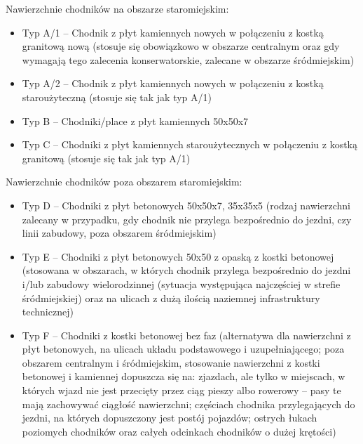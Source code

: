 \documentclass[twoside,12pt]{article}
\begin{document}
Nawierzchnie chodników na obszarze staromiejskim:
	 \begin{itemize}\setlength{\itemsep}{0em}
	 \item Typ A/1 -- Chodnik z płyt kamiennych nowych w połączeniu z kostką granitową nową (stosuje się obowiązkowo w obszarze centralnym oraz gdy wymagają tego zalecenia konserwatorskie, zalecane w obszarze śródmiejskim) \cite{standardy_wroclaw}
	 \item Typ A/2 -- Chodnik z płyt kamiennych nowych w połączeniu z kostką staroużyteczną (stosuje się tak jak typ A/1) \cite{standardy_wroclaw}
	 \item Typ B -- Chodniki/place z płyt kamiennych 50x50x7
	 \item Typ C -- Chodniki z płyt kamiennych staroużytecznych w połączeniu z kostką granitową (stosuje się tak jak typ A/1) \cite{standardy_wroclaw}
	 \end{itemize}
Nawierzchnie chodników poza obszarem staromiejskim:
	 \begin{itemize}\setlength{\itemsep}{0em}
	 \item Typ D -- Chodniki z płyt betonowych 50x50x7, 35x35x5 (rodzaj nawierzchni zalecany w przypadku, gdy chodnik nie przylega bezpośrednio do jezdni, czy linii zabudowy, poza obszarem śródmiejskim) \cite{standardy_wroclaw}
	 \item Typ E -- Chodniki z płyt betonowych 50x50 z opaską z kostki betonowej (stosowana w obszarach, w których chodnik przylega bezpośrednio do jezdni i/lub zabudowy wielorodzinnej (sytuacja występująca najczęściej w strefie śródmiejskiej) oraz na ulicach z dużą ilością naziemnej infrastruktury technicznej) \cite{standardy_wroclaw}
	 \item Typ F -- Chodniki z kostki betonowej bez faz (alternatywa dla nawierzchni z płyt betonowych, na ulicach układu podstawowego i uzupełniającego; poza obszarem centralnym i śródmiejskim, stosowanie nawierzchni z kostki betonowej i kamiennej dopuszcza się na:
zjazdach, ale tylko w miejscach, w których wjazd nie jest przecięty przez ciąg pieszy albo rowerowy -- pasy te mają zachowywać ciągłość nawierzchni; częściach chodnika przylegających do jezdni, na których dopuszczony jest postój pojazdów; ostrych łukach poziomych chodników oraz całych odcinkach chodników o dużej krętości) \cite{standardy_wroclaw}
	 \end{itemize}
	 
\end{document}
